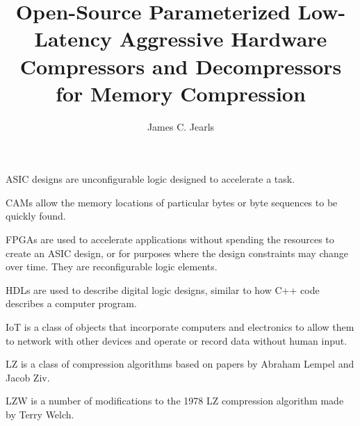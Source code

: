 \documentclass[doublespace,nopageskip]{VTthesis}
\title{Open-Source Parameterized Low-Latency Aggressive Hardware Compressors and Decompressors for Memory Compression}
\author{James C. Jearls}
\begin{document}
  \frontmatter
  \maketitle
  \tableofcontents

	\listoffigures
	\listoftables
    \printnomenclature %


ASIC designs are unconfigurable logic designed to accelerate a task.


CAMs allow the memory locations of particular bytes or byte sequences to be quickly found.


FPGAs are used to accelerate applications without spending the resources to create an ASIC design, or for purposes where the design constraints may change over time. They are reconfigurable logic elements.


HDLs are used to describe digital logic designs, similar to how C++ code describes a computer program.


IoT is a class of objects that incorporate computers and electronics to allow them to network with other devices and operate or record data without human input.


LZ is a class of compression algorithms based on papers by Abraham Lempel and Jacob Ziv.
 
 
LZW is a number of modifications to the 1978 LZ compression algorithm made by Terry Welch.
 

\mainmatter
\end{document}
